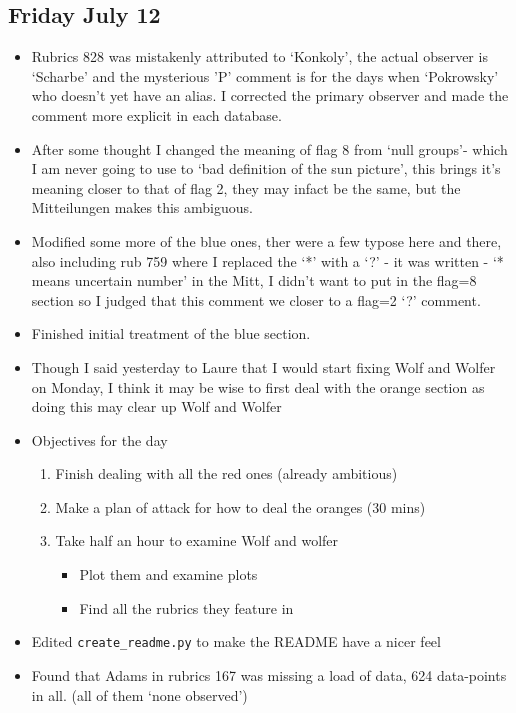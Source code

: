 \documentclass[12pt]{article}
\begin{document}
\subsection{Friday July 12}
\begin{itemize}
    \item Rubrics 828 was mistakenly attributed to `Konkoly', the actual observer is `Scharbe' and the mysterious 'P' comment is for the days when `Pokrowsky' who doesn't yet have an alias. I corrected the primary observer and made the comment more explicit in each database.
    \item After some thought I changed the meaning of flag 8 from `null groups'- which I am never going to use to `bad definition of the sun picture', this brings it's meaning closer to that of flag 2, they may infact be the same, but the Mitteilungen makes this ambiguous.
    \item Modified some more of the blue ones, ther were a few typose here and there, also including rub 759 where I replaced the `*' with a `?' - it was written - `* means uncertain number' in the Mitt, I didn't want to put in the flag=8 section so I judged that this comment we closer to a flag=2 `?' comment.
    \item Finished initial treatment of the blue section.
    \item Though I said yesterday to Laure that I would start fixing Wolf and Wolfer on Monday, I think it may be wise to first deal with the orange section as doing this may clear up Wolf and Wolfer 
    \item Objectives for the day
    \begin{enumerate}
        \item Finish dealing with all the red ones (already ambitious)
        \item Make a plan of attack for how to deal the oranges (30 mins)
        \item Take half an hour to examine Wolf and wolfer
        \begin{itemize}
            \item Plot them and examine plots
            \item Find all the rubrics they feature in
        \end{itemize}
    \end{enumerate}
    \item Edited \texttt{create\_readme.py} to make the README have a nicer feel
    \item Found that Adams in rubrics 167 was missing a load of data, 624 data-points in all. (all of them `none observed')

\end{itemize}
\end{document}
